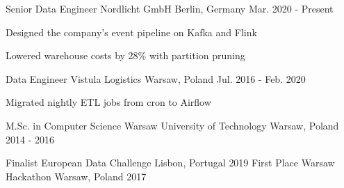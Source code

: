 \documentclass[11pt, a4paper]{awesome-cv}
\begin{document}
\makecvheader

\begin{cventries}
  \cventry
    {Senior Data Engineer}
    {Nordlicht GmbH}
    {Berlin, Germany}
    {Mar. 2020 - Present}
    {
      \begin{cvitems}
        \item {Designed the company's event pipeline on Kafka and Flink}
        \item {Lowered warehouse costs by 28\% with partition pruning}
      \end{cvitems}
    }
  \cventry
    {Data Engineer}
    {Vistula Logistics}
    {Warsaw, Poland}
    {Jul. 2016 - Feb. 2020}
    {
      \begin{cvitems}
        \item {Migrated nightly ETL jobs from cron to Airflow}
      \end{cvitems}
    }
\end{cventries}

\begin{cventries}
  \cventry
    {M.Sc. in Computer Science}
    {Warsaw University of Technology}
    {Warsaw, Poland}
    {2014 - 2016}
    {}
\end{cventries}

\begin{cventries}
  \cventry
    {Finalist}
    {European Data Challenge}
    {Lisbon, Portugal}
    {2019}
    {}
  \cventry
    {First Place}
    {Warsaw Hackathon}
    {Warsaw, Poland}
    {2017}
    {}
\end{cventries}
\end{document}
